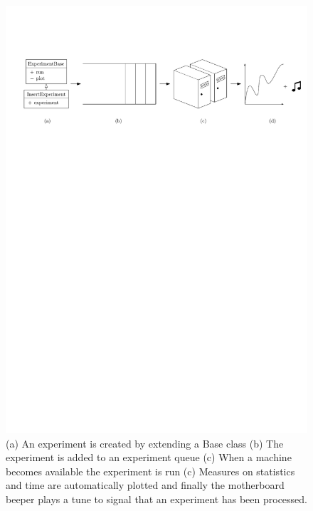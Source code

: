 \documentclass[twoside,11pt,openright]{report}
\begin{document}
\begin{figure}[h]
	\centering
	\includegraphics[width=\textwidth]{../figures/experimental_setup3}
	\caption{(a) An experiment is created by extending a Base class (b) The experiment is added to an experiment queue (c) When a machine becomes available the experiment is run (c) Measures on statistics and time are automatically plotted and finally the motherboard beeper plays a tune to signal that an experiment has been processed.}
	\label{fig:experimental_setup2}
\end{figure}
\end{document}
